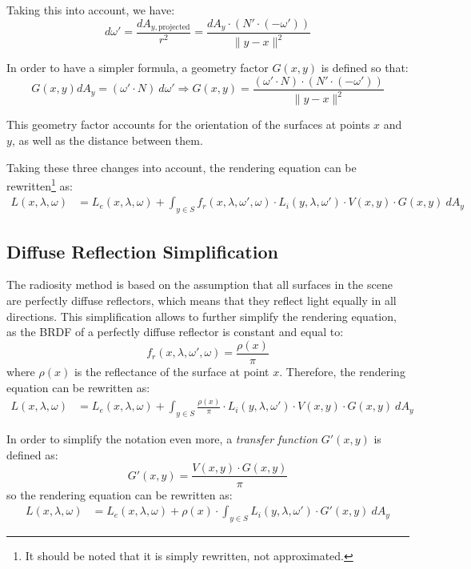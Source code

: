 \begin{itemize}
    Taking this into account, we have:
    \begin{equation*}
        d\omega' = \frac{dA_{y,\text{projected}}}{r^2} = \frac{dA_y \cdot (N' \cdot (-\omega'))}{\|y-x\|^2}
    \end{equation*}

    In order to have a simpler formula, a geometry factor $G(x, y)$ is defined so that:
    \begin{equation*}
    G(x, y) dA_y = (\omega' \cdot N) \ d\omega'
    \Longrightarrow
    G(x, y) = \frac{(\omega' \cdot N) \cdot (N' \cdot (-\omega'))}{\|y-x\|^2}
    \end{equation*}
    
    This geometry factor accounts for the orientation of the surfaces at points $x$ and $y$, as well as the distance between them.
\end{itemize}

Taking these three changes into account, the rendering equation can be rewritten\footnote{It should be noted that it is simply rewritten, not approximated.} as:
\begin{align*}
    L(x, \lambda, \omega) &= L_e(x, \lambda, \omega) + \int_{y\in S} f_r(x, \lambda, \omega', \omega) \cdot L_i(y, \lambda, \omega') \cdot V(x, y) \cdot G(x, y) \ dA_y
\end{align*}

\subsection{Diffuse Reflection Simplification}

The radiosity method is based on the assumption that all surfaces in the scene are perfectly diffuse reflectors, which means that they reflect light equally in all directions. This simplification allows to further simplify the rendering equation, as the BRDF of a perfectly diffuse reflector is constant and equal to:
\begin{equation*}
    f_r(x, \lambda, \omega', \omega) = \frac{\rho(x)}{\pi}
\end{equation*}
where $\rho(x)$ is the reflectance of the surface at point $x$. Therefore, the rendering equation can be rewritten as:
\begin{align*}
    L(x, \lambda, \omega) &= L_e(x, \lambda, \omega) + \int_{y\in S} \frac{\rho(x)}{\pi} \cdot L_i(y, \lambda, \omega') \cdot V(x, y) \cdot G(x, y) \ dA_y
\end{align*}

In order to simplify the notation even more, a \emph{transfer function} $G'(x, y)$ is defined as:
\begin{equation*}
    G'(x, y) = \frac{V(x, y) \cdot G(x, y)}{\pi}
\end{equation*}
so the rendering equation can be rewritten as:
\begin{align*}
    L(x, \lambda, \omega) &= L_e(x, \lambda, \omega) + \rho(x) \cdot \int_{y\in S} L_i(y, \lambda, \omega') \cdot G'(x, y) \ dA_y
\end{align*}

